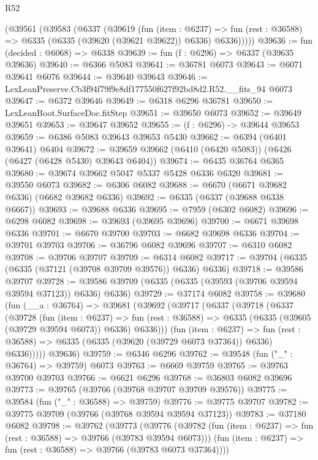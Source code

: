 \begin{lexlean}{R52}
\begin{coremodule}
    (@39561
      (@39583
        (@6337
          (@39619
            (fun (item : @6237) =>
            fun (rest : @36588) => @6335 (@6335 (@39620 (@39621 @39622)) @6336) @6336)))))
@39636 := fun (decided : @6068) => @6338
@39639 := fun (f : @6296) => @6337 (@39635 @39636)
@39640 := @6366 @5083
@39641 := @36781 @6073
@39643 := @6071 @39641 @6076
@39644 := @39640 @39643
@39646 := LexLeanPreserve.Cb3f94f79f9e8df177550f627f92bd8d2.R52.__fits_94 @6073
@39647 := @6372 @39646
@39649 := @6318 @6296 @36781
@39650 := LexLeanBoot.SurfaceDoc.fitStep
@39651 := @39650 @6073
@39652 := @39649 @39651
@39653 := @39647 @39652
@39655 := (f : @6296) -> @39644 @39653
@39659 := @6386 @5083 @39643 @39653 @5430
@39662 := @6394 (@6401 @39641) @6404
@39672 := @39659 @39662 (@6410 (@6420 @5083)) (@6426 (@6427 (@6428 @5430) @39643 @6404))
@39674 := @6435 @36764 @6365
@39680 := @39674 @39662 @5047 @5337 @5428 @6336 @6320
@39681 := @39550 @6073
@39682 := @6306 @6082
@39688 := @6670 (@6671 @39682 @6336) (@6682 @39682 @6336)
@39692 := @6335 (@6337 (@39688 @6338 @6667))
@39693 := @39688 @6336
@39695 := @7959 (@6302 @6082)
@39696 := @6298 @6082
@39698 := @39693 (@39695 @39696)
@39700 := @6671 @39698 @6336
@39701 := @6670 @39700
@39703 := @6682 @39698 @6336
@39704 := @39701 @39703
@39706 := @36796 @6082 @39696
@39707 := @6310 @6082
@39708 := @39706 @39707
@39709 := @6314 @6082
@39717 := @39704 (@6335 (@6335 (@37121 (@39708 @39709 @39576)) @6336) @6336)
@39718 := @39586 @39707
@39728 := @39586 @39709 (@6335 (@6335 (@39593 (@39706 @39594 @39594 @37123)) @6336) @6336)
@39729 := @37174 @6082
@39758 := @39680
    (fun (__a : @36764) =>
    @39681
      (@39692
        (@39717
          (@6337
            (@39718
              (@6337
                (@39728
                  (fun (item : @6237) =>
                  fun (rest : @36588) => @6335 (@6335 (@39605 (@39729 @39594 @6073)) @6336) @6336)))
              (fun (item : @6237) =>
              fun (rest : @36588) => @6335 (@6335 (@39620 (@39729 @6073 @37364)) @6336) @6336)))))
      @39636)
@39759 := @6346 @6296
@39762 := @39548 (fun ("_" : @36764) => @39759) @6073
@39763 := @6669 @39759
@39765 := @39763 @39700 @39703
@39766 := @6621 @6296
@39768 := @36803 @6082 @39696
@39773 := @39765 (@39766 (@39768 @39707 @39709 @39576))
@39775 := @39584 (fun ("_" : @36588) => @39759)
@39776 := @39775 @39707
@39782 := @39775 @39709 (@39766 (@39768 @39594 @39594 @37123))
@39783 := @37180 @6082
@39798 := @39762
    (@39773
      (@39776
        (@39782 (fun (item : @6237) => fun (rest : @36588) => @39766 (@39783 @39594 @6073)))
        (fun (item : @6237) => fun (rest : @36588) => @39766 (@39783 @6073 @37364))))

\end{coremodule}
\end{lexlean}
